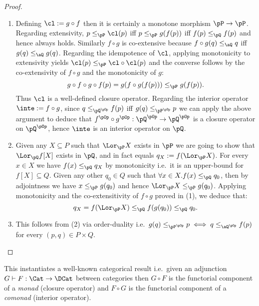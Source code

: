 \documentclass{article}
\begin{document}
\begin{proof}
\item
\begin{enumerate}
\item
Defining $\cl := g \circ f$ then it is certainly a monotone morphism $\pP \to \pP$. Regarding extensivity, $p \leq_\pP \cl(p)$ iff $p \leq_\pP g(f(p))$ iff $f(p) \leq_\pQ f(p)$ and hence always holds. Similarly $f \circ g$ is co-extensive because $f \circ g(q) \leq_\aQ q$ iff $g(q) \leq_\aQ g(q)$. Regarding the idempotence of $\cl$, applying monotonicity to extensivity yields $\cl(p) \leq_\pP \cl \circ \cl(p)$ and the converse follows by the co-extensivity of $f \circ g$ and the monotonicity of $g$:
\[
g \circ f \circ g \circ f(p)
= g(f \circ g(f(p)))
\leq_\pP g (f(p)).
\]
Thus $\cl$ is a well-defined closure operator. Regarding the interior operator $\inte := f \circ g$, since $q \leq_{\pQ^{\pOp}} f(p)$ iff $g(q) \leq_{\pP^{\pOp}} p$ we can apply the above argument to deduce that $f^{\pOp} \circ g^{\pOp} : \pQ^{\pOp} \to \pQ^{\pOp}$ is a closure operator on $\pQ^{\pOp}$, hence $\inte$ is an interior operator on $\pQ$.

\item
Given any $X \subseteq P$ such that $\Lor_\pP X$ exists in $\pP$ we are going to show that $\Lor_\pQ f[X]$ exists in $\pQ$, and in fact equals $q_X := f(\Lor_\pP X)$. For every $x \in X$ we have $f(x) \leq_\pQ q_X$ by monotonicity i.e.\ it is an upper-bound for $f[X] \subseteq Q$. Given any other $q_0 \in Q$ such that $\forall x \in X. f(x) \leq_\pQ q_0$, then by adjointness we have $x \leq_\pP g(q_0)$ and hence $\Lor_\pP X \leq_\pP g(q_0)$. Applying monotonicity and the co-extensitivity of $f \circ g$ proved in (1), we deduce that:
\[
q_X = f(\Lor_\pP X) \leq_\pQ f(g(q_0)) \leq_\pQ q_0.
\]

\item
This follows from (2) via order-duality i.e.\ $g(q) \leq_{\pP^{\pOp}} p \iff q \leq_{\aQ^{\pOp}} f(p)$ for every $(p,q) \in P \times Q$.

\end{enumerate}
\end{proof}


\begin{note}
This instantiates a well-known categorical result i.e.\ given an adjunction $G \vdash F : \Cat \to \DCat$ between categories then  $G \circ F$ is the functorial component of a \emph{monad} (closure operator) and $F \circ G$ is the functorial component of a \emph{comonad} (interior operator). \endbox
\end{note}
\end{document}
